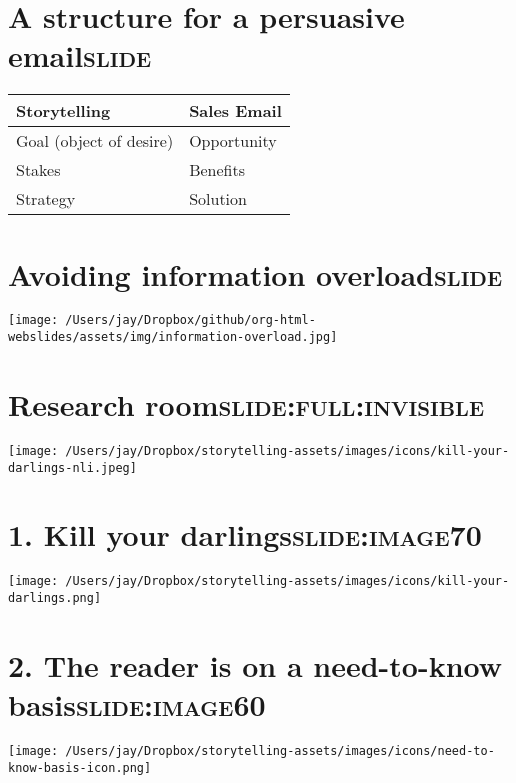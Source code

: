 \documentclass[12pt]{article}
\begin{document}
\section[A structure for a persuasive email]{A structure for a persuasive email\hfill{}\textsc{slide}}
\label{sec:orgf203d4a}
\begin{center}
\begin{tabular}{ll}
\hline
Storytelling & Sales Email\\
\hline
Goal (object of desire) & Opportunity\\
Stakes & Benefits\\
Strategy & Solution\\
\hline
\end{tabular}
\end{center}

\section[Avoiding information \textbf{overload}]{Avoiding information \textbf{overload}\hfill{}\textsc{slide}}
\label{sec:org72279f2}
\begin{center}
\texttt{[image: /Users/jay/Dropbox/github/org-html-webslides/assets/img/information-overload.jpg]}
\end{center}

\section[Research room]{Research room\hfill{}\textsc{slide:full:invisible}}
\label{sec:org3f6b6f4}
\begin{center}
\texttt{[image: /Users/jay/Dropbox/storytelling-assets/images/icons/kill-your-darlings-nli.jpeg]}
\end{center}

\section[1. \textbf{Kill} your \textbf{darlings}]{1. \textbf{Kill} your \textbf{darlings}\hfill{}\textsc{slide:image70}}
\label{sec:orgc527f00}
\begin{center}
\texttt{[image: /Users/jay/Dropbox/storytelling-assets/images/icons/kill-your-darlings.png]}
\end{center}

\section[2. The reader is on a \textbf{need-to-know basis}]{2. The reader is on a \textbf{need-to-know basis}\hfill{}\textsc{slide:image60}}
\label{sec:org1987e84}
\begin{center}
\texttt{[image: /Users/jay/Dropbox/storytelling-assets/images/icons/need-to-know-basis-icon.png]}
\end{center}
\end{document}
